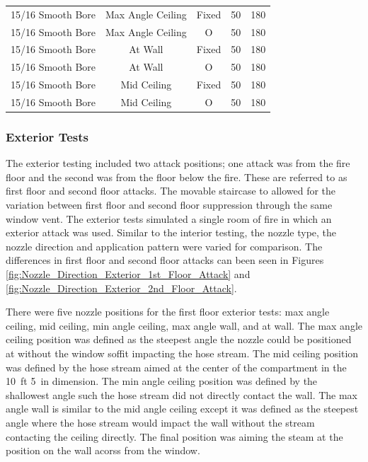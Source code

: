 \documentclass{article}
\begin{document}
\begin{table}[]
\begin{tabular}{ccccc}
15/16 Smooth Bore & Max Angle Ceiling   & Fixed   & 50 & 180 \\
15/16 Smooth Bore & Max Angle Ceiling   & O & 50  & 180 \\
15/16 Smooth Bore & At Wall     		& Fixed   & 50 & 180 \\
15/16 Smooth Bore & At Wall     		& O & 50  & 180 \\
15/16 Smooth Bore & Mid Ceiling 		& Fixed   & 50 & 180 \\
15/16 Smooth Bore & Mid Ceiling 		& O & 50  & 180 \\
\bottomrule[1.25pt]
\end{tabular}
\end{table}

\clearpage

\subsubsection{Exterior Tests}
\label{ext_tests}

The exterior testing included two attack positions; one attack was from the fire floor and the second was from the floor below the fire. These are referred to as first floor and second floor attacks. The movable staircase to allowed for the variation between first floor and second floor suppression through the same window vent. The exterior tests simulated a single room of fire in which an exterior attack was used. Similar to the interior testing, the nozzle type, the nozzle direction and application pattern were varied for comparison. The differences in first floor and second floor attacks can been seen in Figures \ref{fig:Nozzle_Direction_Exterior_1st_Floor_Attack} and \ref{fig:Nozzle_Direction_Exterior_2nd_Floor_Attack}. 

There were five nozzle positions for the first floor exterior tests: max angle ceiling, mid ceiling, min angle ceiling, max angle wall, and at wall. The max angle ceiling position was defined as the steepest angle the nozzle could be positioned at without the window soffit impacting the hose stream. The mid ceiling position was defined by the hose stream aimed at the center of the compartment in the 10~ft 5~in dimension. The min angle ceiling position was defined by the shallowest angle such the hose stream did not directly contact the wall. The max angle wall is similar to the mid angle ceiling except it was defined as the steepest angle where the hose stream would impact the wall without the stream contacting the ceiling directly. The final position was aiming the steam at the position on the wall acorss from the window.
\end{document}
